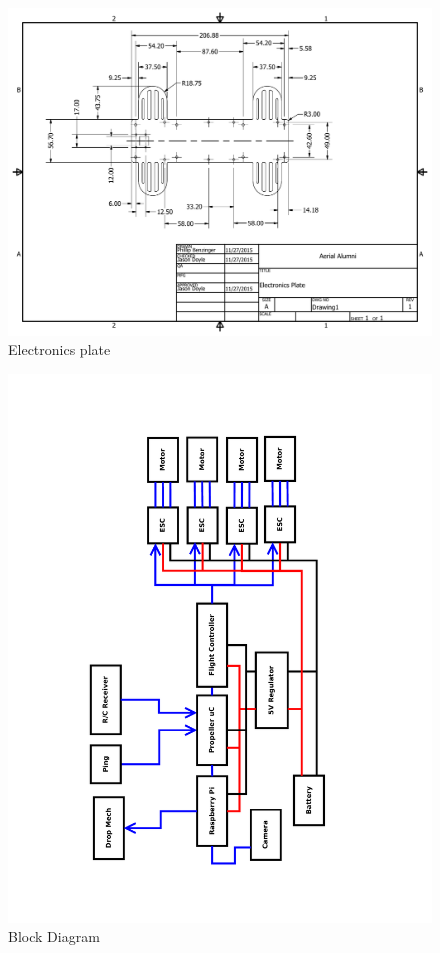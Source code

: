 \documentclass{article}
\begin{document}
\begin{figure}[h!]
\caption{Electronics plate}
\includegraphics[scale=0.65, angle=90]{CAD.pdf}
\end{figure}

\begin{figure}[t]
\caption{Block Diagram}
\includegraphics[width=\textwidth]{Block_Diagam_v2.pdf}
\end{figure}
\end{document}
